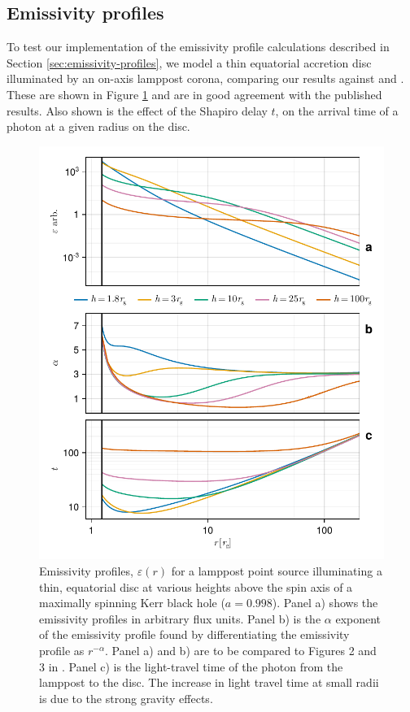 \documentclass[fleqn,usenatbib]{mnras}
\begin{document}
\subsection{Emissivity profiles}

To test our implementation of the emissivity profile calculations described in Section \ref{sec:emissivity-profiles}, we
model a thin equatorial accretion
disc illuminated by an on-axis lamppost corona, comparing our results against
\cite{wilkins_understanding_2012} and \cite{dauser_irradiation_2013}. These are
shown in Figure \ref{fig:emissivity-profiles} and are in good agreement with
the published results. Also shown is the effect of the Shapiro delay $t$, on the
arrival time of a photon at a given radius on the disc.

\begin{figure}
	\centering
	\includegraphics[width=0.99\linewidth]{figures/emissivity.point-source.pdf}
    \caption{Emissivity profiles, $\varepsilon(r)$ for a lamppost point source illuminating a thin, equatorial disc at various heights
        above the spin axis of a maximally spinning Kerr black hole ($a =
        0.998$). Panel a) shows the emissivity profiles in arbitrary flux units.
        Panel b) is the $\alpha$ exponent of the emissivity profile found by
        differentiating the emissivity profile as $r^{-\alpha}$.  Panel a) and
        b) are to be compared to Figures 2 and 3 in
        \citet{dauser_irradiation_2013}. Panel c) is the light-travel time of
        the photon from the lamppost to the disc. The increase in light travel
        time at small radii is due to the strong gravity effects.
}
	\label{fig:emissivity-profiles}
\end{figure}
\end{document}
